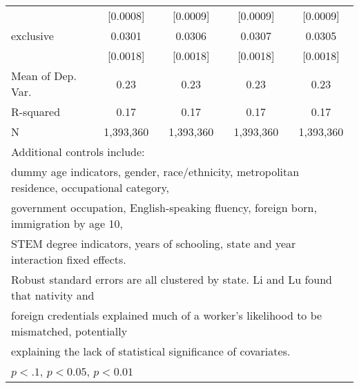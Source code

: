 \begin{table}[htbp]
\begin{tabular}{l*{4}{c}}
                    &    [0.0008]         &    [0.0009]         &    [0.0009]         &    [0.0009]         \\
\addlinespace
exclusive           &      0.0301\sym{***}&      0.0306\sym{***}&      0.0307\sym{***}&      0.0305\sym{***}\\
                    &    [0.0018]         &    [0.0018]         &    [0.0018]         &    [0.0018]         \\
\midrule
Mean of Dep. Var.   &        0.23         &        0.23         &        0.23         &        0.23         \\
R-squared           &        0.17         &        0.17         &        0.17         &        0.17         \\
N                   &   1,393,360         &   1,393,360         &   1,393,360         &   1,393,360         \\
\bottomrule
\multicolumn{5}{l}{\footnotesize Additional controls include:}\\
\multicolumn{5}{l}{\footnotesize dummy age indicators, gender, race/ethnicity, metropolitan residence, occupational category,}\\
\multicolumn{5}{l}{\footnotesize government occupation, English-speaking fluency, foreign born, immigration by age 10,}\\
\multicolumn{5}{l}{\footnotesize STEM degree indicators, years of schooling, state and year interaction fixed effects.}\\
\multicolumn{5}{l}{\footnotesize Robust standard errors are all clustered by state. Li and Lu found that nativity and}\\
\multicolumn{5}{l}{\footnotesize foreign credentials explained much of a worker's likelihood to be mismatched, potentially}\\
\multicolumn{5}{l}{\footnotesize explaining the lack of statistical significance of covariates.}\\
\multicolumn{5}{l}{\footnotesize \sym{*} \(p<.1\), \sym{**} \(p<0.05\), \sym{***} \(p<0.01\)}\\
\end{tabular}
\end{table}
